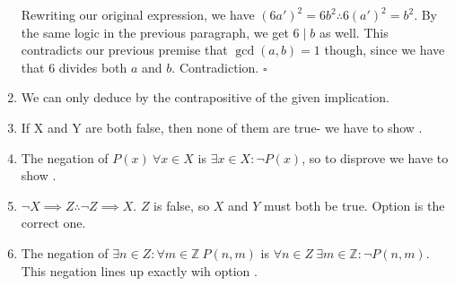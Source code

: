 \documentclass[12pt]{article}
\begin{document}
\begin{enumerate}
            Rewriting our original expression, we have $\left(6a'\right)^2=6b^2 \therefore 6\left(a'\right)^2=b^2$.
            By the same logic in the previous paragraph, we get $6 \mid b$ as well.
            This contradicts our previous premise that $\gcd(a, b)=1$ though, since
            we have that $6$ divides both $a$ and $b$.
            Contradiction. $\square$

      \item We can only deduce  by the contrapositive of the given implication.

      \item If X and Y are both false, then none of them are true- we have to show .

      \item The negation of $P(x)\ \forall x \in X$ is $\exists x \in X: \lnot P(x)$,
            so to disprove we have to show .

      \item $\lnot X \implies Z \therefore \lnot Z \implies X$.
            $Z$ is false, so $X$ and $Y$ must both be true.
            Option  is the correct one.

      \item The negation of $\exists n \in Z: \forall m \in \mathbb{Z}\ P(n, m)$ is
            $\forall n \in Z\ \exists m \in \mathbb{Z}: \lnot P(n, m)$.
            This negation lines up exactly wih option .
\end{enumerate}
\end{document}
